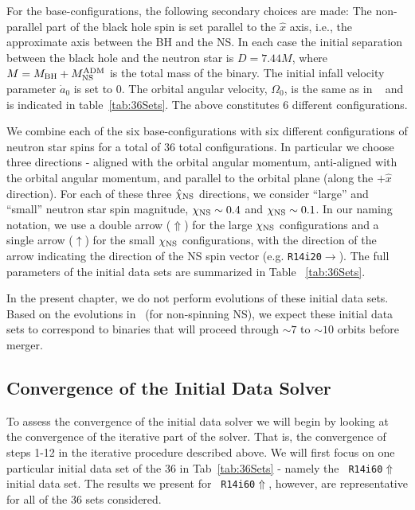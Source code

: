 For the base-configurations, the following secondary choices are made:
The non-parallel part of the black hole spin is set parallel
to the $\hat{x}$ axis, i.e., the approximate axis between the BH and the NS. In each case the initial separation between the
black hole and the neutron star is $D=7.44M$, where
$M=M_{\rm BH}+M^{\rm ADM}_{\rm NS}$ is the total mass of the
binary. The initial infall velocity parameter $\dot{a}_0$ is set to
$0$. The orbital angular velocity, $\Omega_0$, is the same as in
~\cite{Foucart:2013a} and is indicated in
table~\ref{tab:36Sets}. The above constitutes 6 different
configurations.

We combine each of the six base-configurations with six different
configurations of neutron star spins for a total of 36 total
configurations. In particular we choose three directions - aligned
with the orbital angular momentum, anti-aligned with the orbital
angular momentum, and parallel to the orbital plane (along the
$+\hat{x}$ direction). For each of these three $\hat\chi_{\rm NS}$ directions, we consider
``large'' and ``small'' neutron star spin magnitude,
$\chi_{\rm NS}\sim 0.4$ and $\chi_{\rm NS}\sim 0.1$. In our
naming notation, we use a double arrow ($\Uparrow$) for the
large $\chi_{\rm NS}$ configurations and a single arrow ($\uparrow$) for the
small $\chi_{\rm NS}$ configurations, with the direction of the arrow indicating the direction
of the NS spin vector (e.g. {\tt R14i20}$\rightarrow$). The full parameters of the initial data sets
are summarized in Table ~\ref{tab:36Sets}. 



In the present chapter, we do not perform evolutions of these initial
data sets. Based on the evolutions in~\cite{Foucart:2013a} (for
non-spinning NS), we expect these initial data sets to correspond to
binaries that will proceed through $\sim 7$ to $\sim 10$ orbits before
merger.



\subsection{Convergence of the Initial Data Solver}
\label{sec:Convergence}

To assess the convergence of the initial data solver we will begin by looking at the convergence of the iterative part of the solver. That is, the convergence of steps 1-12 in the iterative procedure
described above. We will first focus on one particular initial data
set of the 36 in Tab~\ref{tab:36Sets} - namely the {\tt
  R14i60$\Uparrow$} initial data set. The results we present for {\tt
  R14i60$\Uparrow$}, however, are representative for all of the 36 sets considered.

